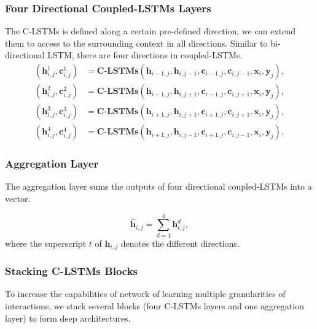 \documentclass{article}
\def\h{\mathbf{h}}
\def\bx{\mathbf{x}}
\def\by{\mathbf{y}}
\def\cc{\mathbf{c}}
\def\cc{\mathbf{c}}
\begin{document}
\subsubsection{Four Directional Coupled-LSTMs Layers}

The C-LSTMs is defined along a certain pre-defined direction, we can extend them to access to the surrounding context in all directions.
Similar to bi-directional LSTM, there are four directions in coupled-LSTMs.
{\small\begin{align}
(\h^1_{i,j},\cc^1_{i,j}) &= \textbf{C-LSTMs}(\h_{i-1,j},\h_{i,j-1},\cc_{i-1,j},\cc_{i,j-1},\bx_i,\by_j),\nonumber\\
(\h^2_{i,j},\cc^2_{i,j})  &= \textbf{C-LSTMs}(\h_{i-1,j},\h_{i,j+1},\cc_{i-1,j},\cc_{i,j+1},\bx_i,\by_j),\nonumber\\
(\h^3_{i,j},\cc^3_{i,j})  &= \textbf{C-LSTMs}(\h_{i+1,j},\h_{i,j+1},\cc_{i+1,j},\cc_{i,j+1},\bx_i,\by_j),\nonumber\\
(\h^4_{i,j},\cc^4_{i,j})  &= \textbf{C-LSTMs}(\h_{i+1,j},\h_{i,j-1},\cc_{i+1,j},\cc_{i,j-1},\bx_i,\by_j).\nonumber
\end{align}
}

\subsubsection{Aggregation Layer}
 The aggregation layer sums the outputs of four directional coupled-LSTMs into a vector.

\begin{equation}
\hat{\h}_{i,j} = \sum_{d=1}^{4}\h_{i,j}^{d},
\end{equation}
where the superscript $t$ of $\h_{i,j}$ denotes the different directions.


\subsubsection{Stacking C-LSTMs Blocks}


To increase the capabilities of network of learning multiple granularities of interactions, we stack several blocks (four C-LSTMs layers and one aggregation layer) to form deep architectures.
\end{document}
